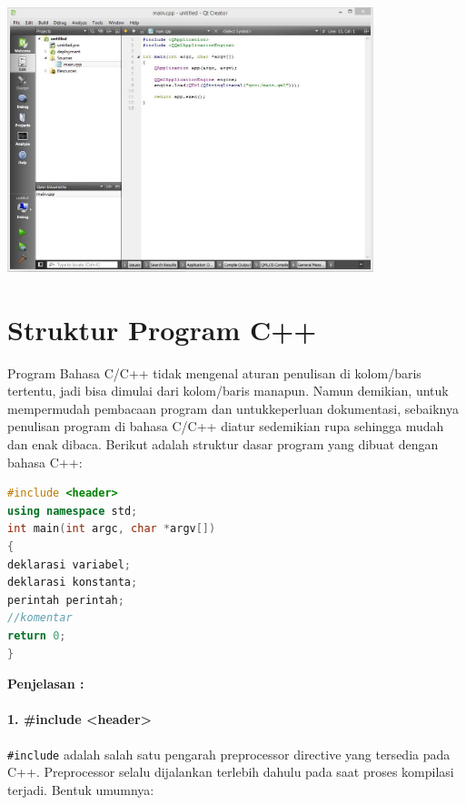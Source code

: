 \begin{center}

\includegraphics[width=0.8\textwidth]{../manuscript/images/qt-creator.jpg}

\end{center}

\section{Struktur Program C++}\label{struktur-program-cpp}

Program Bahasa C/C++ tidak mengenal aturan penulisan di kolom/baris
tertentu, jadi bisa dimulai dari kolom/baris manapun. Namun demikian,
untuk mempermudah pembacaan program dan untukkeperluan dokumentasi,
sebaiknya penulisan program di bahasa C/C++ diatur sedemikian rupa
sehingga mudah dan enak dibaca. Berikut adalah struktur dasar program
yang dibuat dengan bahasa C++:

\begin{lstlisting}[language=c++, caption=Struktur Program C++]
#include <header>  
using namespace std;    
int main(int argc, char *argv[])
{  
deklarasi variabel;   
deklarasi konstanta;  
perintah perintah;  
//komentar  
return 0;  
}  
\end{lstlisting}

\textbf{Penjelasan :}

\paragraph{ 1. \#include <header>}

\texttt{\#include} adalah salah satu pengarah preprocessor directive
yang tersedia pada C++. Preprocessor selalu dijalankan terlebih dahulu
pada saat proses kompilasi terjadi. Bentuk umumnya:

